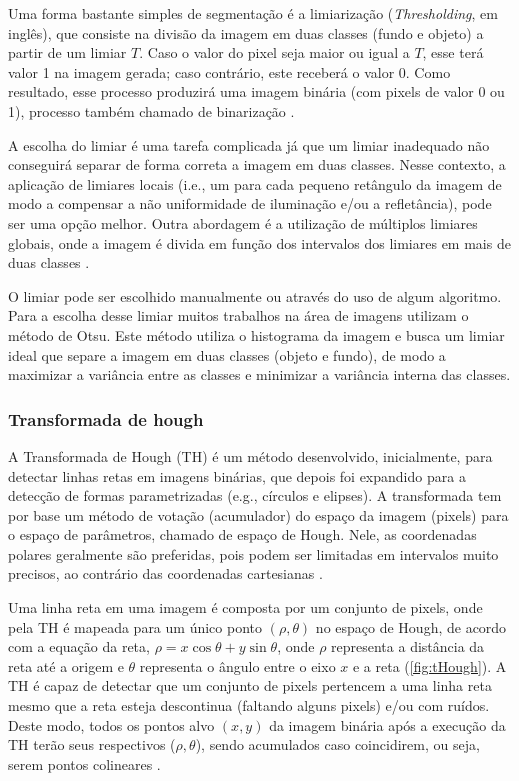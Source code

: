 \documentclass[12pt, a4paper, english, brazil]{article}
\begin{document}
Uma forma bastante simples de segmentação é a limiarização (\textit{Thresholding}, em inglês), que consiste na divisão da imagem em duas classes (fundo e objeto) a partir de um limiar $T$. Caso o valor do pixel seja maior ou igual a $T$, esse terá valor 1 na imagem gerada; caso contrário, este receberá o valor 0. Como resultado, esse processo produzirá uma imagem binária (com pixels de valor 0 ou 1), processo também chamado de binarização \cite{Marques_Filho_1999}.

A escolha do limiar é uma tarefa complicada já que um limiar inadequado não conseguirá separar de forma correta a imagem em duas classes. Nesse contexto, a aplicação de limiares locais (i.e., um para cada pequeno retângulo da imagem de modo a compensar a não uniformidade de iluminação e/ou a refletância), pode ser uma opção melhor. Outra abordagem é a utilização de múltiplos limiares globais, onde a imagem é divida em função dos intervalos dos limiares em mais de duas classes \cite{Gonzalez_Woods_2010}.

O limiar pode ser escolhido manualmente ou através do uso de algum algoritmo. Para a escolha desse limiar muitos trabalhos na área de imagens utilizam o método de Otsu. Este método \cite{Otsu_1979} utiliza o histograma da imagem e busca um limiar ideal que separe a imagem em duas classes (objeto e fundo), de modo a maximizar a variância entre as classes e minimizar a variância interna das classes.

\subsubsection{Transformada de hough}

A Transformada de Hough (TH) é um método desenvolvido, inicialmente, para detectar linhas retas em imagens binárias, que depois foi expandido para a detecção de formas parametrizadas (e.g., círculos e elipses). A transformada tem por base um método de votação (acumulador) do espaço da imagem (pixels) para o espaço de parâmetros, chamado de espaço de Hough. Nele, as coordenadas polares geralmente são preferidas, pois podem ser limitadas em intervalos muito precisos, ao contrário das coordenadas cartesianas \cite{Bah_2020}.

Uma linha reta em uma imagem é composta por um conjunto de pixels, onde pela TH é mapeada para um único ponto $(\rho, \theta)$ no espaço de Hough, de acordo com a equação da reta, $\rho = x \cos \theta + y \sin \theta$, onde $\rho$ representa a distância da reta até a origem e $\theta$ representa o ângulo entre o eixo $x$ e a reta (\autoref{fig:tHough}). A TH é capaz de detectar que um conjunto de pixels pertencem a uma linha reta mesmo que a reta esteja descontinua (faltando alguns pixels) e/ou com ruídos. Deste modo, todos os pontos alvo $(x, y)$ da imagem binária após a execução da TH terão seus respectivos ($\rho, \theta$), sendo acumulados caso coincidirem, ou seja, serem pontos colineares \cite{Huiying_2015}.
\end{document}
